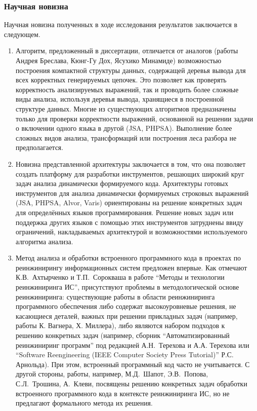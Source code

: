 \subsubsection*{\large{Научная новизна}}

Научная новизна полученных в ходе исследования результатов заключается в следующем.

\begin{enumerate}

\item Алгоритм, предложенный в диссертации, отличается от аналогов (работы Андрея Бреслава, Кюнг-Гу Дох, Ясухико Минамиде) возможностью построения компактной структуры данных, содержащей деревья вывода для всех корректных генерируемых цепочек. Это позволяет как проверять корректность анализируемых выражений, так и проводить более сложные виды анализа, используя деревья вывода, хранящиеся в построенной структуре данных. Многие из существующих алгоритмов предназначены только для проверки корректности выражений, основанной на решении задачи о включении одного языка в другой (JSA, PHPSA). Выполнение более сложных видов анализа, трансформаций или построения леса разбора не предполагается. 

\item Новизна представленной архитектуры заключается в том, что она позволяет создать платформу для разработки инструментов, решающих широкий круг задач анализа динамически формируемого кода. Архитектуры готовых инструментов для анализа динамически формируемых строковых выражений (JSA, PHPSA, Alvor, Varis) ориентированы на решение конкретных задач для определённых языков программирования. Решение новых задач или поддержка других языков с помощью этих инструментов затруднены ввиду ограничений, накладываемых архитектурой и возможностями используемого алгоритма анализа. 

\item Метод анализа и обработки встроенного программного кода в проектах по реинжинирингу информационных систем предложен впервые. Как отмечают К.В.~Ахтырченко и Т.П.~Сорокваша в работе ``Методы и технологии реинжиниринга ИС'', присутствуют проблемы в методологической основе реинжиниринга: существующие работы в области реинжиниринга программного обеспечения либо содержат высокоуровневые решения, не касающиеся деталей, важных при решении прикладных задач (например, работы К. Вагнера, Х. Миллера), либо являются набором подходов к решению конкретных задач (например, сборник ``Автоматизированный реинжиниринг программ'' под редакцией А.Н.~Терехова и А.А. Терехова или ``Software Reengineering (IEEE Computer Society Press Tutorial)'' Р.С. Арнольда). При этом, встроенный программный код часто не учитывается. С другой стороны, работы, например, М.Д.~Шапот, Э.В.~Попова, С.Л.~Трошина, А.~Клеви,  посвящены решению конкретных задач обработки встроенного программного кода в контексте реинжиниринга ИС, но не предлагают формального метода их решения.

\end{enumerate}


